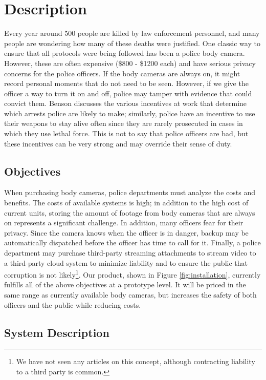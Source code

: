 \documentclass[12pt]{article}
\begin{document}
\section{Description}
Every year around 500 people are killed by law enforcement personnel, and many
people are wondering how many of these deaths were justified. One classic way
to ensure that all protocols were being followed has been a police body camera.
However, these are often expensive (\$800 - \$1200 each\cite{cam}) and have
serious privacy concerns for the police officers. If the body cameras are
always on, it might record personal moments that do not need to be seen.
However, if we give the officer a way to turn it on and off, police may tamper
with evidence that could convict them. Benson discusses the various incentives
at work that determine which arrests police are likely to
make\cite[ch.~6]{enterprise_of_law}; similarly, police have an incentive to use
their weapons to stay alive often since they are rarely prosecuted in cases in
which they use lethal force\cite{no_conviction_1,no_conviction_2}. This is not
to say that police officers are bad, but these incentives can be very strong
and may override their sense of duty.

\subsection{Objectives}
When purchasing body cameras, police departments must analyze the costs and
benefits.  The costs of available systems is high; in addition to the high cost
of current units\cite{cam}, storing the amount of footage from body cameras
that are always on represents a significant challenge\cite{store1,store2}. In
addition, many officers fear for their privacy\cite{officer_privacy}. Since the
camera knows when the officer is in danger, backup may be automatically
dispatched before the officer has time to call for it. Finally, a police
department may purchase third-party streaming attachments to stream video to a
third-party cloud system to minimize liability and to ensure the public that
corruption is not likely\footnote{We have not seen any articles on this
concept, although contracting liability to a third party is common.}.  Our
product, shown in Figure \ref{fig:installation}, currently fulfills all of the
above objectives at a prototype level.  It will be priced in the same range as
currently available body cameras, but increases the safety of both officers and
the public while reducing costs.

\subsection{System Description}
\end{document}
